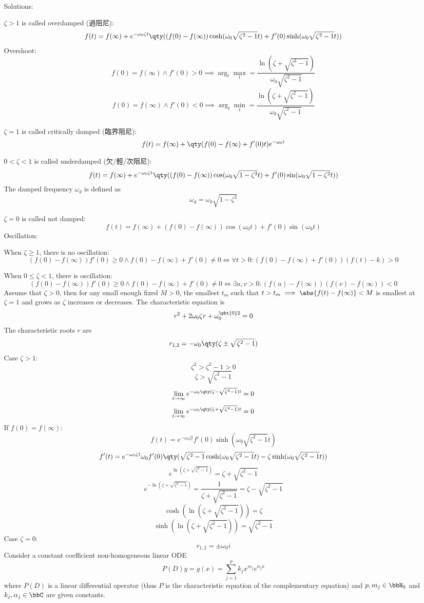 \documentclass[a4paper,12pt]{report}
\begin{document}
Solutions:
\bit
\item $\zeta>1$ is called overdamped (過阻尼):
\[f(t)=f(\infty)+e^{-\omega_0\zeta t}\qty((f(0)-f(\infty))\cosh(\omega_0\sqrt{\zeta^2-1}t)+f'(0)\sinh(\omega_0\sqrt{\zeta^2-1}t))\]
Overshoot:
\[f(0)=f(\infty)\land f'(0)>0\implies\arg_t\max_t=\frac{\ln(\zeta+\sqrt{\zeta^2-1})}{\omega_0\sqrt{\zeta^2-1}}\]
\[f(0)=f(\infty)\land f'(0)<0\implies\arg_t\min_t=\frac{\ln(\zeta+\sqrt{\zeta^2-1})}{\omega_0\sqrt{\zeta^2-1}}\]
\item $\zeta=1$ is called critically damped (臨界阻尼):
\[f(t)=f(\infty)+\qty(f(0)-f(\infty)+f'(0)t)e^{-\omega_0t}\]
\item $0<\zeta<1$ is called underdamped (欠/輕/次阻尼):
\[f(t)=f(\infty)+e^{-\omega_0\zeta t}\qty((f(0)-f(\infty))\cos(\omega_0\sqrt{1-\zeta^2}t)+f'(0)\sin(\omega_0\sqrt{1-\zeta^2}t))\]
The damped frequency $\omega_d$ is defined as
\[\omega_d=\omega_0\sqrt{1-\zeta^2}\]
\item $\zeta=0$ is called not damped:
\[f(t)=f(\infty)+(f(0)-f(\infty))\cos(\omega_0t)+f'(0)\sin(\omega_0t)\]
\eit
Oscillation:
\bit
\item When $\zeta\ge1$, there is no oscillation:
\[(f(0)-f(\infty))f'(0)\ge0\land f(0)-f(\infty)+f'(0)\ne0\iff\forall t>0\colon (f(0)-f(\infty)+f'(0))(f(t)-k)>0\]
\item When $0\le\zeta<1$, there is oscillation:
\[(f(0)-f(\infty))f'(0)\ge0\land f(0)-f(\infty)+f'(0)\ne0\iff\exists u,v>0\colon(f(u)-f(\infty))(f(v)-f(\infty))<0\]
\eit
Assume that $\zeta>0$, then for any small enough fixed $M>0$, the smallest $t_m$ such that $t>t_m\implies\abs{f(t)-f(\infty)}<M$ is smallest at $\zeta=1$ and grows as $\zeta$ increases or decreases.
\bpr
The characteristic equation is
\[r^2+2\omega_0\zeta r+\omega_0^{\pht{0}2}=0\]
The characteristic roots $r$ are
\[r_{1,2}=-\omega_0\qty(\zeta\pm\sqrt{\zeta^2-1})\]
Case $\zeta>1$:
\[\zeta^2>\zeta^2-1>0\]
\[\zeta>\sqrt{\zeta^2-1}\]
\[\lim_{t\to\infty}e^{-\omega_0\qty(\zeta-\sqrt{\zeta^2-1})t}=0\]
\[\lim_{t\to\infty}e^{-\omega_0\qty(\zeta+\sqrt{\zeta^2-1})t}=0\]
If $f(0)=f(\infty)$:
\[f(t)=e^{-\omega_0\zeta t}f'(0)\sinh(\omega_0\sqrt{\zeta^2-1}t)\]
\[f'(t)=e^{-\omega_0\zeta t}\omega_0f'(0)\qty(\sqrt{\zeta^2-1}\cosh(\omega_0\sqrt{\zeta^2-1}t)-\zeta\sinh(\omega_0\sqrt{\zeta^2-1}t))\]
\[e^{\ln(\zeta+\sqrt{\zeta^2-1})}=\zeta+\sqrt{\zeta^2-1}\]
\[e^{-\ln(\zeta+\sqrt{\zeta^2-1})}=\frac{1}{\zeta+\sqrt{\zeta^2-1}}=\zeta-\sqrt{\zeta^2-1}\]
\[\cosh(\ln(\zeta+\sqrt{\zeta^2-1}))=\zeta\]
\[\sinh(\ln(\zeta+\sqrt{\zeta^2-1}))=\sqrt{\zeta^2-1}\]
Case $\zeta=0$:
\[r_{1,2}=\pm\omega_0i\]
\epr
{}
Consider a constant coefficient non-homogeneous linear ODE
\[P(D)y=g(x)=\sum_{j=1}^pk_jx^{m_j}e^{\alpha_jx}\]
where $P(D)$ is a linear differential operator (thus $P$ is the characteristic equation of the complementary equation) and $p,m_j\in\bbN_0$ and $k_j,\alpha_j\in\bbC$ are given constants.
\end{document}
